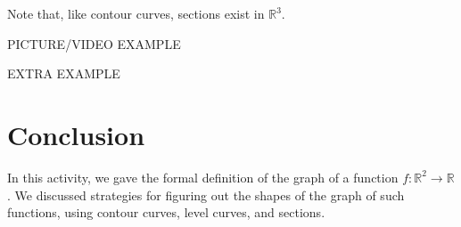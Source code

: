 \documentclass{ximera}
\begin{document}
Note that, like contour curves, sections exist in $\mathbb{R}^3$.

PICTURE/VIDEO EXAMPLE

EXTRA EXAMPLE



\section{Conclusion}

In this activity, we gave the formal definition of the graph of a function $f:\mathbb{R}^2\rightarrow\mathbb{R}$. We discussed strategies for figuring out the shapes of the graph of such functions, using contour curves, level curves, and sections.
\end{document}
